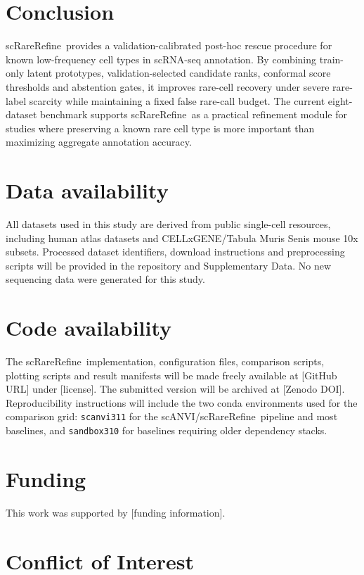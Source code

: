 \documentclass[11pt]{article}
\newcommand{\method}{scRareRefine}
\begin{document}
\section{Conclusion}

\method\ provides a validation-calibrated post-hoc rescue procedure for known
low-frequency cell types in scRNA-seq annotation. By combining train-only
latent prototypes, validation-selected candidate ranks, conformal score
thresholds and abstention gates, it improves rare-cell recovery under severe
rare-label scarcity while maintaining a fixed false rare-call budget. The
current eight-dataset benchmark supports \method\ as a practical refinement
module for studies where preserving a known rare cell type is more important
than maximizing aggregate annotation accuracy.

\section*{Data availability}

All datasets used in this study are derived from public single-cell resources,
including human atlas datasets and CELLxGENE/Tabula Muris Senis mouse 10x
subsets. Processed dataset identifiers, download instructions and preprocessing
scripts will be provided in the repository and Supplementary Data. No new
sequencing data were generated for this study.

\section*{Code availability}

The \method\ implementation, configuration files, comparison scripts, plotting
scripts and result manifests will be made freely available at [GitHub URL]
under [license]. The submitted version will be archived at [Zenodo DOI].
Reproducibility instructions will include the two conda environments used for
the comparison grid: \texttt{scanvi311} for the scANVI/\method\ pipeline and
most baselines, and \texttt{sandbox310} for baselines requiring older dependency
stacks.

\section*{Funding}

This work was supported by [funding information].

\section*{Conflict of Interest}
\end{document}
